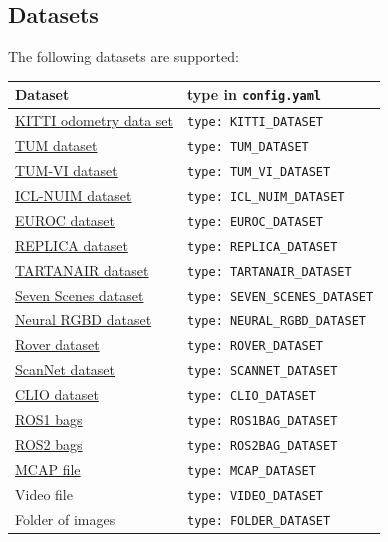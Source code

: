 \documentclass{article}
\begin{document}
\hypertarget{datasets}{%
\subsection{Datasets}\label{datasets}}

The following datasets are supported:

\begin{longtable}[]{@{}ll@{}}
\toprule
Dataset & type in \texttt{config.yaml}\tabularnewline
\midrule
\endhead
\href{http://www.cvlibs.net/datasets/kitti/eval_odometry.php}{KITTI
odometry data set} \cite{Geiger2012CVPR} &
\texttt{type:\ KITTI\_DATASET} \tabularnewline
\href{https://vision.in.tum.de/data/datasets/rgbd-dataset/download}{TUM
dataset} \cite{sturm12iros} & \texttt{type:\ TUM\_DATASET} \tabularnewline
\href{https://cvg.cit.tum.de/data/datasets/visual-inertial-dataset}{TUM-VI
dataset} \cite{schubert2018tumvi} & \texttt{type:\ TUM\_VI\_DATASET} \tabularnewline
\href{https://www.doc.ic.ac.uk/~ahanda/VaFRIC/iclnuim.html}{ICL-NUIM
dataset} \cite{handa:etal:ICRA2014} & \texttt{type:\ ICL\_NUIM\_DATASET}\tabularnewline
\href{https://projects.asl.ethz.ch/datasets/euroc-mav/}{EUROC
dataset} \cite{Burri25012016} & \texttt{type:\ EUROC\_DATASET}\tabularnewline
\href{https://github.com/facebookresearch/Replica-Dataset}{REPLICA
dataset} \cite{replica19arxiv} & \texttt{type:\ REPLICA\_DATASET}\tabularnewline
\href{https://theairlab.org/tartanair-dataset/}{TARTANAIR dataset} \cite{tartanair2020iros} &
\texttt{type:\ TARTANAIR\_DATASET}\tabularnewline
\href{https://www.microsoft.com/en-us/research/project/rgb-d-dataset-7-scenes/}{Seven Scenes dataset} \cite{seven_scenes} &
\texttt{type:\ SEVEN\_SCENES\_DATASET}\tabularnewline
\href{https://github.com/dazinovic/neural-rgbd-surface-reconstruction}{Neural RGBD dataset} \cite{Azinovic_2022_CVPR} &
\texttt{type:\ NEURAL\_RGBD\_DATASET}\tabularnewline
\href{https://iis-esslingen.github.io/rover/}{Rover dataset} \cite{schmidt2025rover} &
\texttt{type:\ ROVER\_DATASET}\tabularnewline
\href{http://www.scan-net.org/}{ScanNet dataset} \cite{dai2017scannet} &
\texttt{type:\ SCANNET\_DATASET}\tabularnewline
\href{https://github.com/MIT-SPARK/Clio}{CLIO dataset} \cite{kim2024clio} &
\texttt{type:\ CLIO\_DATASET}\tabularnewline
\href{https://wiki.ros.org/Bags}{ROS1 bags} &
\texttt{type:\ ROS1BAG\_DATASET}\tabularnewline
\href{https://docs.ros.org/en/foxy/Tutorials/Beginner-CLI-Tools/Recording-And-Playing-Back-Data/Recording-And-Playing-Back-Data.html}{ROS2
bags} & \texttt{type:\ ROS2BAG\_DATASET}\tabularnewline
\href{https://foxglove.dev/blog/introducing-the-mcap-file-format}{MCAP
file} & \texttt{type:\ MCAP\_DATASET}\tabularnewline
Video file & \texttt{type:\ VIDEO\_DATASET}\tabularnewline
Folder of images & \texttt{type:\ FOLDER\_DATASET}\tabularnewline
\bottomrule
\end{longtable}
\end{document}
